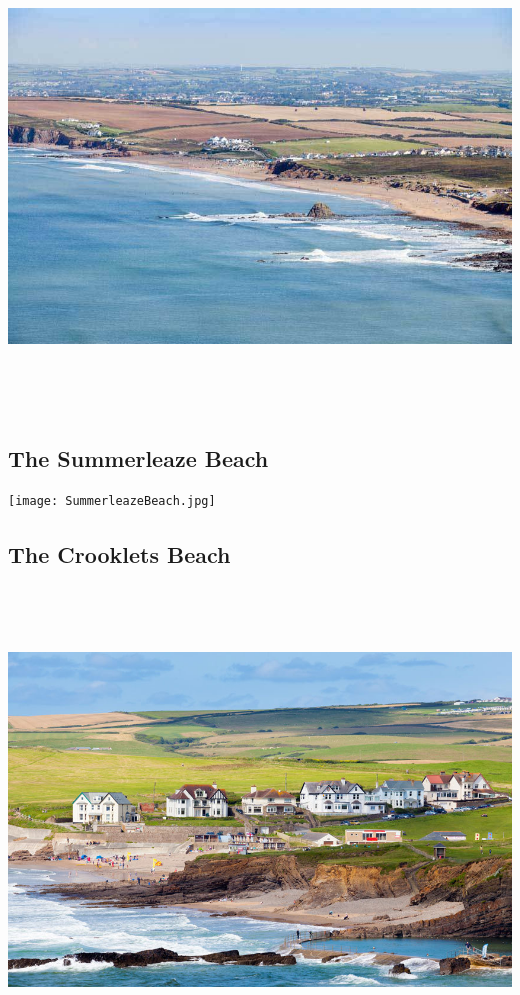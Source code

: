 \documentclass[]{article}
\begin{document}
\includegraphics[width=400pt,height=350pt]{BudeBeaches.jpg}

\subsection{\texorpdfstring{\textbf{The Summerleaze
Beach}}{The Summerleaze Beach}}\label{the-summerleaze-beach}

\texttt{[image: SummerleazeBeach.jpg]}

\subsection{\texorpdfstring{\textbf{The Crooklets
Beach}}{The Crooklets Beach}}\label{the-crooklets-beach}

\includegraphics[width=400pt,height=350pt]{CrookletsBeach.jpg}
\end{document}
